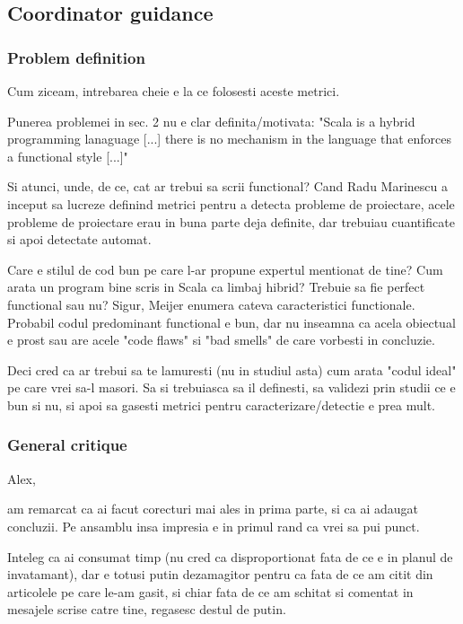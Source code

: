 \documentclass{article}
\begin{document}
\subsection {Coordinator guidance}

\subsubsection {Problem definition}
Cum ziceam, intrebarea cheie e la ce folosesti aceste metrici.

Punerea problemei in sec. 2 nu e clar definita/motivata:
"Scala is a hybrid programming lanaguage [...] there is no mechanism in
the language that enforces a functional style [...]"

Si atunci, unde, de ce, cat ar trebui sa scrii functional?
Cand Radu Marinescu a inceput sa lucreze definind metrici pentru a detecta
probleme de proiectare, acele probleme de proiectare erau in buna parte
deja definite, dar trebuiau cuantificate si apoi detectate automat.

Care e stilul de cod bun pe care l-ar propune expertul mentionat de tine?
Cum arata un program bine scris in Scala ca limbaj hibrid?
Trebuie sa fie perfect functional sau nu?
Sigur, Meijer enumera cateva caracteristici functionale. Probabil codul
predominant functional e bun, dar nu inseamna ca acela obiectual e prost
sau are acele "code flaws" si "bad smells" de care vorbesti in concluzie.

Deci cred ca ar trebui sa te lamuresti (nu in studiul asta) cum arata
"codul ideal" pe care vrei sa-l masori. Sa si trebuiasca sa il definesti,
sa validezi prin studii ce e bun si nu, si apoi sa gasesti metrici
pentru caracterizare/detectie e prea mult.

\subsubsection {General critique}

Alex,

am remarcat ca ai facut corecturi mai ales in prima parte, si ca ai
adaugat concluzii.
Pe ansamblu insa impresia e in primul rand ca vrei sa pui punct.

Inteleg ca ai consumat timp (nu cred ca disproportionat fata de ce e
in planul de invatamant), dar e totusi putin dezamagitor pentru ca
fata de ce am citit din articolele pe care le-am gasit, si chiar
fata de ce am schitat si comentat in mesajele scrise catre tine,
regasesc destul de putin.
\end{document}
